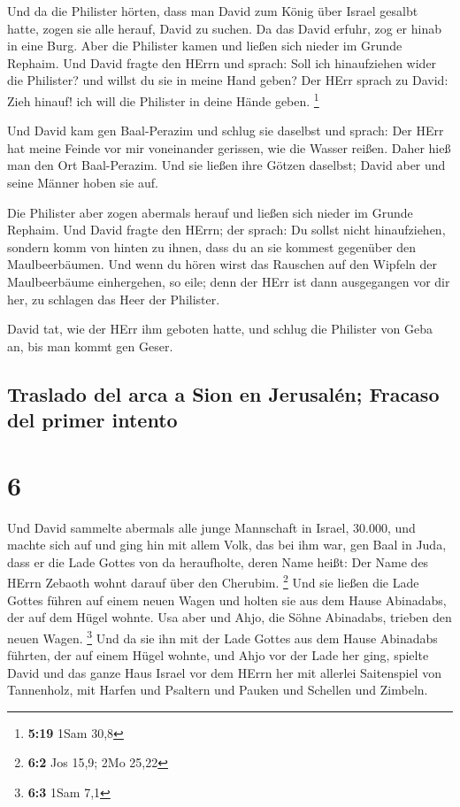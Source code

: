  Und da die Philister hörten, dass man David zum König
über Israel gesalbt hatte, zogen sie alle herauf, David zu suchen. Da
das David erfuhr, zog er hinab in eine Burg.  Aber die
Philister kamen und ließen sich nieder im Grunde Rephaim.
 Und David fragte den HErrn und sprach: Soll ich
hinaufziehen wider die Philister? und willst du sie in meine Hand geben?
Der HErr sprach zu David: Zieh hinauf! ich will die Philister in deine
Hände geben. \footnote{\textbf{5:19} 1Sam 30,8}

 Und David kam gen Baal-Perazim und schlug sie daselbst
und sprach: Der HErr hat meine Feinde vor mir voneinander gerissen, wie
die Wasser reißen. Daher hieß man den Ort Baal-Perazim. 
Und sie ließen ihre Götzen daselbst; David aber und seine Männer hoben
sie auf.

 Die Philister aber zogen abermals herauf und ließen sich
nieder im Grunde Rephaim.  Und David fragte den HErrn;
der sprach: Du sollst nicht hinaufziehen, sondern komm von hinten zu
ihnen, dass du an sie kommest gegenüber den Maulbeerbäumen.
 Und wenn du hören wirst das Rauschen auf den Wipfeln der
Maulbeerbäume einhergehen, so eile; denn der HErr ist dann ausgegangen
vor dir her, zu schlagen das Heer der Philister.

 David tat, wie der HErr ihm geboten hatte, und schlug
die Philister von Geba an, bis man kommt gen Geser.

\hypertarget{traslado-del-arca-a-sion-en-jerusaluxe9n-fracaso-del-primer-intento}{%
\subsection{Traslado del arca a Sion en Jerusalén; Fracaso del primer
intento}\label{traslado-del-arca-a-sion-en-jerusaluxe9n-fracaso-del-primer-intento}}

\hypertarget{section-5}{%
\section{6}\label{section-5}}

 Und David sammelte abermals alle junge Mannschaft in
Israel, 30.000,  und machte sich auf und ging hin mit
allem Volk, das bei ihm war, gen Baal in Juda, dass er die Lade Gottes
von da heraufholte, deren Name heißt: Der Name des HErrn Zebaoth wohnt
darauf über den Cherubim. \footnote{\textbf{6:2} Jos 15,9; 2Mo 25,22}
 Und sie ließen die Lade Gottes führen auf einem neuen
Wagen und holten sie aus dem Hause Abinadabs, der auf dem Hügel wohnte.
Usa aber und Ahjo, die Söhne Abinadabs, trieben den neuen Wagen.
\footnote{\textbf{6:3} 1Sam 7,1}  Und da sie ihn mit der
Lade Gottes aus dem Hause Abinadabs führten, der auf einem Hügel wohnte,
und Ahjo vor der Lade her ging,  spielte David und das
ganze Haus Israel vor dem HErrn her mit allerlei Saitenspiel von
Tannenholz, mit Harfen und Psaltern und Pauken und Schellen und Zimbeln.

